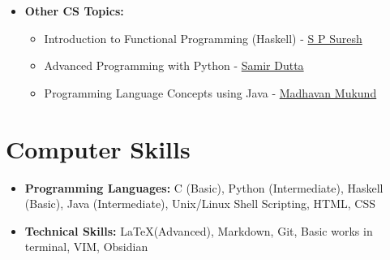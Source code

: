 \documentclass[10pt,a4paper,sans,colorlinks]{moderncv}        %
\begin{document}
\begin{itemize}
\begin{itemize}
		            \vspace*{5mm}
		      \item \textbf{Other CS Topics:} \begin{itemize}
			            \item Introduction to Functional Programming (Haskell) - \href{https://www.cmi.ac.in/~spsuresh/}{S P Suresh}
			            \item Advanced Programming with Python - \href{https://www.cmi.ac.in/~sdatta/}{Samir Dutta}
			            \item Programming Language Concepts using Java - \href{https://www.cmi.ac.in/~madhavan/}{Madhavan Mukund}
		            \end{itemize}

	      \end{itemize}

\end{itemize}



\section{Computer Skills}

\begin{itemize}

	\item \textbf{Programming Languages:} C (Basic), Python (Intermediate), Haskell (Basic), Java (Intermediate), Unix/Linux Shell Scripting, HTML, CSS

	\item \textbf{Technical Skills:} \LaTeX (Advanced), Markdown, Git, Basic works in terminal, VIM, Obsidian


\end{itemize}
%
%
%
%
%	
\end{document}
